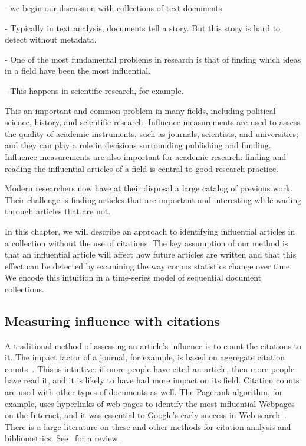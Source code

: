 \label{chapter:influence}

- we begin our discussion with collections of text documents

- Typically in text analysis, documents tell a story.  But this story
is hard to detect without metadata.

- One of the most fundamental problems in research is that of finding
which ideas in a field have been the most influential.

- This happens in scientific research, for example.

This an important and common problem in many fields, including
political science, history, and scientific research.
Influence measurements are used to assess the quality of academic
instruments, such as journals, scientists, and universities; and they
can play a role in decisions surrounding publishing and funding.
Influence measurements are also important for academic research:
finding and reading the influential articles of a field is central to
good research practice.

Modern researchers now have at their disposal a large catalog of
previous work.  Their challenge is finding articles that are important
and interesting while wading through articles that are not.

In this chapter, we will describe an approach to identifying
influential articles in a collection without the use of citations.
The key assumption of our method is that an influential article will
affect how future articles are written and that this effect can be
detected by examining the way corpus statistics change over time.  We
encode this intuition in a time-series model of sequential document
collections.

\subsection*{Measuring influence with citations}

A traditional method of assessing an article's influence is to count
the citations to it. The impact factor of a journal, for example, is
based on aggregate citation counts~\cite{garfield:2002}.  This is
intuitive: if more people have cited an article, then more people have
read it, and it is likely to have had more impact on its field.
Citation counts are used with other types of documents as well.  The
Pagerank algorithm, for example, uses hyperlinks of web-pages to
identify the most influential Webpages on the Internet, and it was
essential to Google's early success in Web search~\cite{brin:1998}.
There is a large literature on these and other methods for citation
analysis and bibliometrics.  See~\cite{osareh:1996} for a review.


